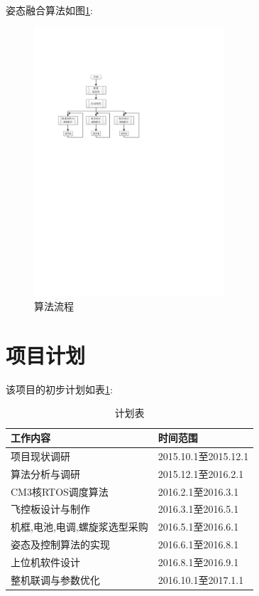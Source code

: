 \documentclass[10pt,a4paper]{article}
\begin{document}
姿态融合算法如图\ref{算法流程}:
\begin{figure}[!hbp]
    \begin{center}
        \includegraphics[height=10cm]{../fig/算法流程.pdf}
        \caption{算法流程}\label{算法流程}
    \end{center}
\end{figure}

\section{项目计划}
该项目的初步计划如表\ref{计划表}:
\begin{table}[!hbp]
\begin{center}
    \begin{tabular}{|l|l|}
        \hline
        工作内容 & 时间范围 \\ 
        \hline
        项目现状调研 & 2015.10.1至2015.12.1 \\
        \hline
        算法分析与调研 & 2015.12.1至2016.2.1 \\
        \hline
        CM3核RTOS调度算法 & 2016.2.1至2016.3.1 \\ 
        \hline
        飞控板设计与制作 & 2016.3.1至2016.5.1 \\
        \hline
        机框,电池,电调,螺旋浆选型采购 & 2016.5.1至2016.6.1 \\
        \hline
        姿态及控制算法的实现 & 2016.6.1至2016.8.1 \\
        \hline
        上位机软件设计 & 2016.8.1至2016.9.1 \\
        \hline
        整机联调与参数优化 & 2016.10.1至2017.1.1 \\
        \hline
\end{tabular}\caption{计划表\label{计划表}}
\end{center}
\end{table}
\end{document}
